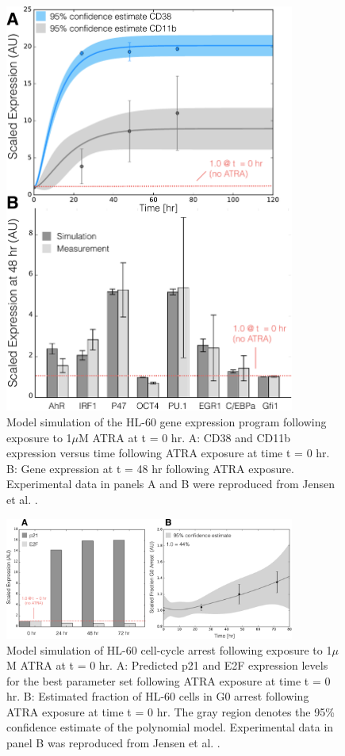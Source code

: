 \documentclass[12pt]{article}
\begin{document}
\begin{figure}[!t]\centering
\includegraphics[width=0.85\textwidth]{./figs/Fig-4-GRN-Simulations.pdf}
\caption{Model simulation of the HL-60 gene expression program following exposure to 1$\mu$M ATRA at t = 0 hr.
A: CD38 and CD11b expression versus time following ATRA exposure at time t = 0 hr.
B: Gene expression at t = 48 hr following ATRA exposure.
Experimental data in panels A and B were reproduced from Jensen et al. \cite{Jensen:2015aa}.}\label{fig:model-grn-simulations}
\end{figure}

\begin{figure}[!t]\centering
\includegraphics[width=0.85\textwidth]{./figs/Fig-5-GRN-CellCycle-Predictions.pdf}
\caption{Model simulation of HL-60 cell-cycle arrest following exposure to 1$\mu$M ATRA at t = 0 hr.
A: Predicted p21 and E2F expression levels for the best parameter set following ATRA exposure at time t = 0 hr.
B: Estimated fraction of HL-60 cells in G0 arrest following ATRA exposure at time t = 0 hr.
The gray region denotes the 95\% confidence estimate of the polynomial model.
Experimental data in panel B was reproduced from Jensen et al. \cite{Jensen:2015aa}.}\label{fig:model-cell-cycle-simulations}
\end{figure}
\end{document}

